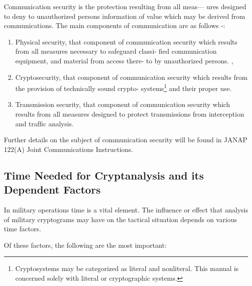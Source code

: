 \mypara Communication security is the protection resulting from all meas—
ures designed to deny to unauthorized persons information of value
which may be derived from communications. The main components of
communication are as follows -:

\begin{enumerate}
\item Physical security, that component of communication security
which results from all measures necessary to safeguard classi-
ﬁed communication equipment, and material from access there-
to by unauthorized persons. ,

\item Cryptosecurity, that component of communication security
which results from the provision of technically sound crypto-
systems\footnote{ Cryptosystems may be categorized as literal and nonliteral. This manual is concerned solely with literal or cryptographic systems.  } and their proper use.

\item Transmission security, that component of communication
security which results from all measures designed to protect
transmissions from interception and trafﬁc analysis.
\end{enumerate}

\mypara Further details on the subject of communication security will be
found in JANAP 122(A) Joint Communications Instructions.

\subsection{Time Needed for Cryptanalysis and its Dependent Factors}

\mypara In military operations time is a vital element. The inﬂuence or effect
that analysis of military cryptograms may have on the tactical situation
depends on various time factors.

\mypara Of these factors, the following are the most important:

